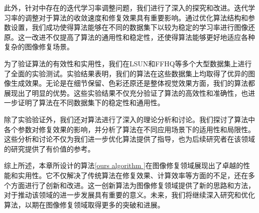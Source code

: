此外，针对\cite{Inverse}中存在的迭代学习率调整问题，我们进行了深入的探究和改进。迭代学习率的调整对于算法的收敛速度和修复效果具有重要影响。通过优化算法结构和参数设置，我们成功使得算法能够在不同的数据集下以较为稳定的学习率进行图像还原。这一改进不仅提高了算法的通用性和稳定性，还使得算法能够更好地适应各种复杂的图像修复场景。     


为了验证算法的有效性和实用性，我们在LSUN和FFHQ等多个大型数据集上进行了全面的实验测试。实验结果表明，我们的算法在这些数据集上均取得了优异的图像生成效果。无论是在细节保留、色彩还原还是整体视觉效果方面，我们的算法都展现出了明显的优势。这些实验结果不仅充分验证了算法的高效性和准确性，也进一步证明了算法在不同数据集下的稳定性和通用性。    


除了实验验证外，我们还对算法进行了深入的理论分析和讨论。我们探讨了算法中各个参数对修复效果的影响，并分析了算法在不同应用场景下的适用性和局限性。这些分析和讨论不仅为我们进一步优化算法提供了指导，也为后续研究者在该领域的研究提供了有价值的参考。     


综上所述，本章所设计的算法\ref{ours algorithm }在图像修复领域展现出了卓越的性能和实用性。它不仅解决了传统算法在修复效果、计算效率等方面的不足，还在多个方面进行了创新和改进。这一创新算法为图像修复领域提供了新的思路和方法，对于推动该领域的进一步发展具有重要的意义。未来，我们将继续深入研究和优化算法，以期在图像修复领域取得更多的突破和进展。